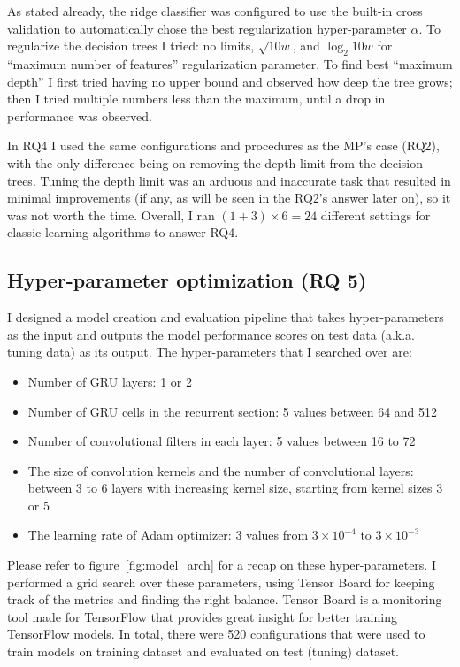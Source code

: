 As stated already, the ridge classifier was configured to use the built-in cross validation to automatically chose the best regularization hyper-parameter $\alpha$.
To regularize the decision trees I tried: no limits, $\sqrt{10w}$, and $\log_2{10w}$ for ``maximum number of features'' regularization parameter. To find best ``maximum depth'' I first tried having no upper bound and observed how deep the tree grows; then I tried multiple numbers less than the maximum, until a drop in performance was observed. 

In RQ4 I used the same configurations and procedures as the MP's case (RQ2), with the only difference being on removing the depth limit from the decision trees. Tuning the depth limit was an arduous and inaccurate task that resulted in minimal improvements (if any, as will be seen in the RQ2's answer later on), so it was not worth the time. Overall, I ran $(1+3)\times6=24$ different settings for classic learning algorithms to answer RQ4. 

\subsection{Hyper-parameter optimization (RQ 5)}
I designed a model creation and evaluation pipeline that takes hyper-parameters as the input and outputs the model performance scores on test data (a.k.a. tuning data) as its output. The hyper-parameters that I searched over are:
\begin{itemize}
    \item Number of GRU layers: 1 or 2
    \item Number of GRU cells in the recurrent section: 5 values between 64 and 512
    \item Number of convolutional filters in each layer: 5 values between 16 to 72
    \item The size of convolution kernels and the number of convolutional layers: between 3 to 6 layers with increasing kernel size, starting from kernel sizes 3 or 5
    \item The learning rate of Adam optimizer: 3 values from $3\times 10^{-4}$ to $3\times10^{-3}$
\end{itemize}
Please refer to figure~\ref{fig:model_arch} for a recap on these hyper-parameters. 
I performed a grid search over these parameters, using Tensor Board for keeping track of the metrics and finding the right balance. 
Tensor Board is a monitoring tool made for TensorFlow that provides great insight for better training TensorFlow models.
In total, there were 520 configurations that were used to train models on training dataset and evaluated on test (tuning) dataset. 

